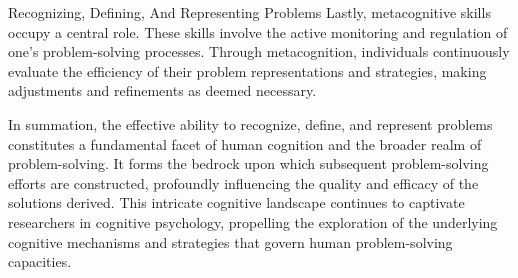 \begin{notes}{Recognizing, Defining, And Representing Problems}
    Lastly, metacognitive skills occupy a central role. These skills involve the active monitoring and regulation of one's problem-solving processes. Through metacognition, individuals continuously evaluate 
    the efficiency of their problem representations and strategies, making adjustments and refinements as deemed necessary.

    In summation, the effective ability to recognize, define, and represent problems constitutes a fundamental facet of human cognition and the broader realm of problem-solving. It forms the bedrock upon 
    which subsequent problem-solving efforts are constructed, profoundly influencing the quality and efficacy of the solutions derived. This intricate cognitive landscape continues to captivate researchers 
    in cognitive psychology, propelling the exploration of the underlying cognitive mechanisms and strategies that govern human problem-solving capacities.
\end{notes}